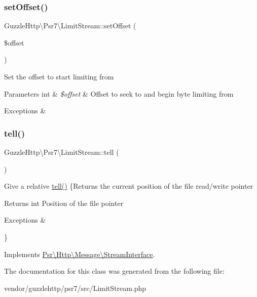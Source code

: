 \subsubsection{\texorpdfstring{set\+Offset()}{setOffset()}}
{\footnotesize\ttfamily Guzzle\+Http\textbackslash{}\+Psr7\textbackslash{}\+Limit\+Stream\+::set\+Offset (\begin{DoxyParamCaption}\item[{}]{\$offset }\end{DoxyParamCaption})}

Set the offset to start limiting from


\begin{DoxyParams}[1]{Parameters}
int & {\em \$offset} & Offset to seek to and begin byte limiting from\\
\hline
\end{DoxyParams}

\begin{DoxyExceptions}{Exceptions}
{\em } & \\
\hline
\end{DoxyExceptions}
\mbox{\label{classGuzzleHttp_1_1Psr7_1_1LimitStream_a7f3f1d99ade05ec436b34d32886defdf}} 
\subsubsection{\texorpdfstring{tell()}{tell()}}
{\footnotesize\ttfamily Guzzle\+Http\textbackslash{}\+Psr7\textbackslash{}\+Limit\+Stream\+::tell (\begin{DoxyParamCaption}{ }\end{DoxyParamCaption})}

Give a relative \hyperlink{classGuzzleHttp_1_1Psr7_1_1LimitStream_a7f3f1d99ade05ec436b34d32886defdf}{tell()} \{Returns the current position of the file read/write pointer

\begin{DoxyReturn}{Returns}
int Position of the file pointer 
\end{DoxyReturn}

\begin{DoxyExceptions}{Exceptions}
{\em } & \\
\hline
\end{DoxyExceptions}
\} 

Implements \hyperlink{interfacePsr_1_1Http_1_1Message_1_1StreamInterface_a9aa2f88a38f496d74100f42ddf0656ef}{Psr\textbackslash{}\+Http\textbackslash{}\+Message\textbackslash{}\+Stream\+Interface}.



The documentation for this class was generated from the following file\+:\begin{DoxyCompactItemize}
\item 
vendor/guzzlehttp/psr7/src/Limit\+Stream.\+php\end{DoxyCompactItemize}
